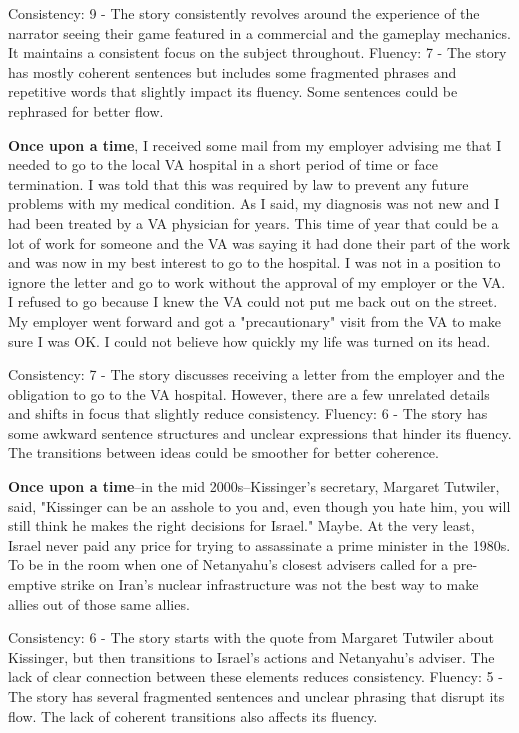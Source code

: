 \documentclass{article}
\begin{document}
Consistency: 9 - The story consistently revolves around the experience of the narrator seeing their game featured in a commercial and the gameplay mechanics. It maintains a consistent focus on the subject throughout.
Fluency: 7 - The story has mostly coherent sentences but includes some fragmented phrases and repetitive words that slightly impact its fluency. Some sentences could be rephrased for better flow.

\textbf{Once upon a time}, I received some mail from my employer advising me that I needed to go to the local VA hospital in a short period of time or face termination. I was told that this was required by law to prevent any future problems with my medical condition. As I said, my diagnosis was not new and I had been treated by a VA physician for years. This time of year that could be a lot of work for someone and the VA was saying it had done their part of the work and was now in my best interest to go to the hospital. I was not in a position to ignore the letter and go to work without the approval of my employer or the VA. I refused to go because I knew the VA could not put me back out on the street. My employer went forward and got a "precautionary" visit from the VA to make sure I was OK. I could not believe how quickly my life was turned on its head.

Consistency: 7 - The story discusses receiving a letter from the employer and the obligation to go to the VA hospital. However, there are a few unrelated details and shifts in focus that slightly reduce consistency.
Fluency: 6 - The story has some awkward sentence structures and unclear expressions that hinder its fluency. The transitions between ideas could be smoother for better coherence.

\textbf{Once upon a time}--in the mid 2000s--Kissinger's secretary, Margaret Tutwiler, said, "Kissinger can be an asshole to you and, even though you hate him, you will still think he makes the right decisions for Israel." Maybe. At the very least, Israel never paid any price for trying to assassinate a prime minister in the 1980s. To be in the room when one of Netanyahu's closest advisers called for a pre-emptive strike on Iran's nuclear infrastructure was not the best way to make allies out of those same allies.

Consistency: 6 - The story starts with the quote from Margaret Tutwiler about Kissinger, but then transitions to Israel's actions and Netanyahu's adviser. The lack of clear connection between these elements reduces consistency.
Fluency: 5 - The story has several fragmented sentences and unclear phrasing that disrupt its flow. The lack of coherent transitions also affects its fluency.
\end{document}
